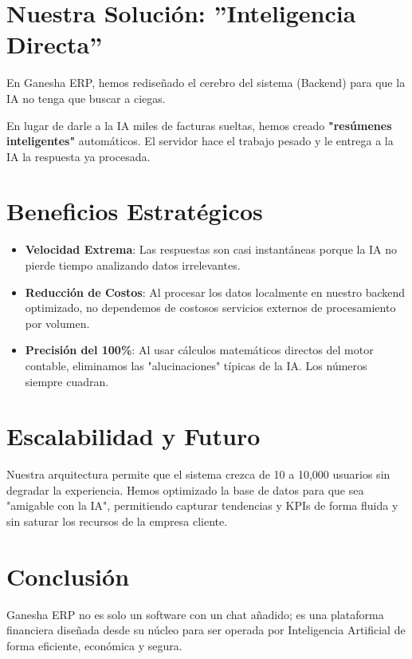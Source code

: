 \documentclass[12pt, a4paper, oneside]{book}
\begin{document}
\chapter{Nuestra Solución: ''Inteligencia Directa''}
En Ganesha ERP, hemos rediseñado el cerebro del sistema (Backend) para que la IA no tenga que buscar a ciegas.

\begin{tcolorbox}[title=Innovación Clave: Canales de Datos Optimizados, colback=successgreen!5, colframe=successgreen]
    En lugar de darle a la IA miles de facturas sueltas, hemos creado \textbf{"resúmenes inteligentes"} automáticos. El servidor hace el trabajo pesado y le entrega a la IA la respuesta ya procesada.
\end{tcolorbox}

\chapter{Beneficios Estratégicos}
\begin{itemize}
    \item \textbf{Velocidad Extrema}: Las respuestas son casi instantáneas porque la IA no pierde tiempo analizando datos irrelevantes.
    \item \textbf{Reducción de Costos}: Al procesar los datos localmente en nuestro backend optimizado, no dependemos de costosos servicios externos de procesamiento por volumen.
    \item \textbf{Precisión del 100\%}: Al usar cálculos matemáticos directos del motor contable, eliminamos las "alucinaciones" típicas de la IA. Los números siempre cuadran.
\end{itemize}

\chapter{Escalabilidad y Futuro}
Nuestra arquitectura permite que el sistema crezca de 10 a 10,000 usuarios sin degradar la experiencia. Hemos optimizado la base de datos para que sea "amigable con la IA", permitiendo capturar tendencias y KPIs de forma fluida y sin saturar los recursos de la empresa cliente.

\chapter{Conclusión}
Ganesha ERP no es solo un software con un chat añadido; es una plataforma financiera diseñada desde su núcleo para ser operada por Inteligencia Artificial de forma eficiente, económica y segura.
\end{document}
